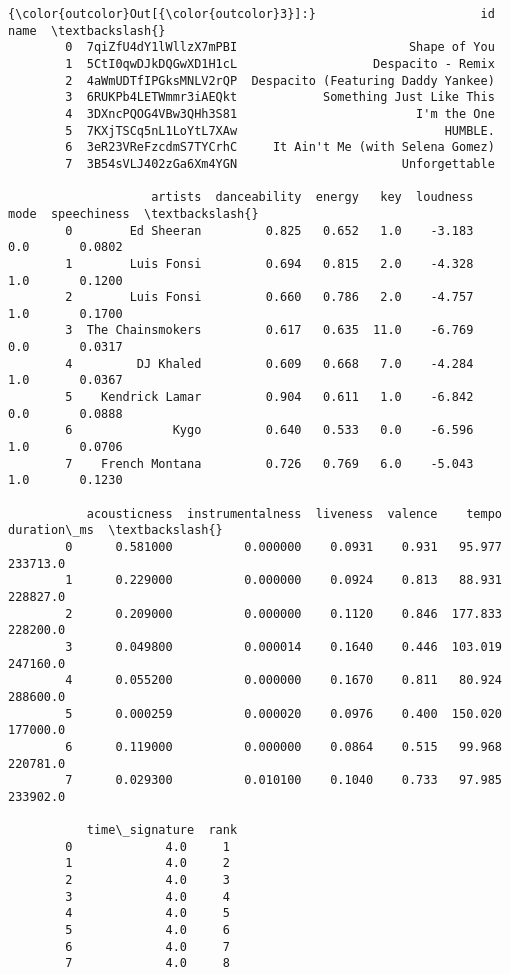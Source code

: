 \documentclass[11pt]{article}
\begin{document}
\begin{Verbatim}[commandchars=\\\{\}]
{\color{outcolor}Out[{\color{outcolor}3}]:}                       id                                name  \textbackslash{}
        0  7qiZfU4dY1lWllzX7mPBI                        Shape of You   
        1  5CtI0qwDJkDQGwXD1H1cL                   Despacito - Remix   
        2  4aWmUDTfIPGksMNLV2rQP  Despacito (Featuring Daddy Yankee)   
        3  6RUKPb4LETWmmr3iAEQkt            Something Just Like This   
        4  3DXncPQOG4VBw3QHh3S81                         I'm the One   
        5  7KXjTSCq5nL1LoYtL7XAw                             HUMBLE.   
        6  3eR23VReFzcdmS7TYCrhC     It Ain't Me (with Selena Gomez)   
        7  3B54sVLJ402zGa6Xm4YGN                       Unforgettable   
        
                    artists  danceability  energy   key  loudness  mode  speechiness  \textbackslash{}
        0        Ed Sheeran         0.825   0.652   1.0    -3.183   0.0       0.0802   
        1        Luis Fonsi         0.694   0.815   2.0    -4.328   1.0       0.1200   
        2        Luis Fonsi         0.660   0.786   2.0    -4.757   1.0       0.1700   
        3  The Chainsmokers         0.617   0.635  11.0    -6.769   0.0       0.0317   
        4         DJ Khaled         0.609   0.668   7.0    -4.284   1.0       0.0367   
        5    Kendrick Lamar         0.904   0.611   1.0    -6.842   0.0       0.0888   
        6              Kygo         0.640   0.533   0.0    -6.596   1.0       0.0706   
        7    French Montana         0.726   0.769   6.0    -5.043   1.0       0.1230   
        
           acousticness  instrumentalness  liveness  valence    tempo  duration\_ms  \textbackslash{}
        0      0.581000          0.000000    0.0931    0.931   95.977     233713.0   
        1      0.229000          0.000000    0.0924    0.813   88.931     228827.0   
        2      0.209000          0.000000    0.1120    0.846  177.833     228200.0   
        3      0.049800          0.000014    0.1640    0.446  103.019     247160.0   
        4      0.055200          0.000000    0.1670    0.811   80.924     288600.0   
        5      0.000259          0.000020    0.0976    0.400  150.020     177000.0   
        6      0.119000          0.000000    0.0864    0.515   99.968     220781.0   
        7      0.029300          0.010100    0.1040    0.733   97.985     233902.0   
        
           time\_signature  rank  
        0             4.0     1  
        1             4.0     2  
        2             4.0     3  
        3             4.0     4  
        4             4.0     5  
        5             4.0     6  
        6             4.0     7  
        7             4.0     8  
\end{Verbatim}
            
\end{document}

